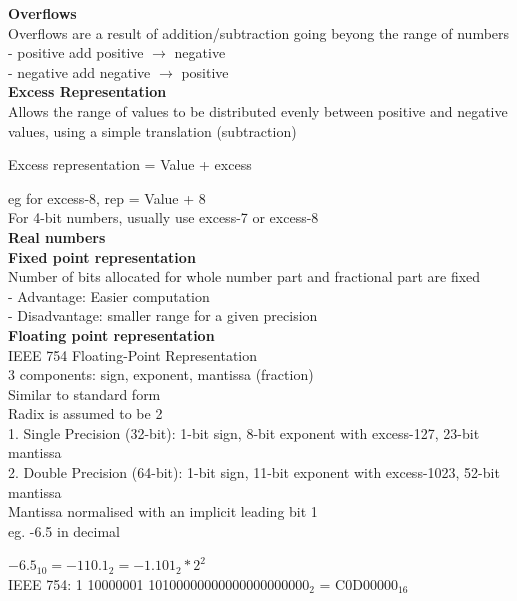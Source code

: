 \documentclass[10pt, a4paper]{article}
\begin{document}
\begin{multicols*}{3}
		\textbf{Overflows}\\
		Overflows are a result of addition/subtraction going beyong the range of numbers\\
		- positive add positive $\rightarrow$ negative\\
		- negative add negative $\rightarrow$ positive\\
		
		\textbf{Excess Representation}\\
		Allows the range of values to be distributed evenly between positive and negative values, using a simple translation (subtraction)
		\begin{center}
			Excess representation = Value + excess
		\end{center}
		eg for excess-8, rep = Value + 8\\
		For 4-bit  numbers, usually use excess-7 or excess-8\\
		
		\textbf{Real numbers}\\
		
		\textbf{Fixed point representation}\\
		Number of bits allocated for whole number part and fractional part are fixed\\
		- Advantage: Easier computation\\
		- Disadvantage: smaller range for a given precision\\		
		
		\textbf{Floating point representation}\\
		IEEE 754 Floating-Point Representation\\
		3 components: sign, exponent, mantissa (fraction)\\
		Similar to standard form\\
		Radix is assumed to be 2\\
		1. Single Precision (32-bit): 1-bit sign, 8-bit exponent with excess-127, 23-bit mantissa\\
		2. Double Precision (64-bit): 1-bit sign, 11-bit exponent with excess-1023, 52-bit mantissa\\
		Mantissa normalised with an implicit leading bit 1\\
		eg. -6.5 in decimal
		\begin{center}
			$-6.5_{10} = -110.1_2 = -1.101_2 * 2^2$\\
			IEEE 754: 1 10000001 10100000000000000000000$_2$ = C0D00000$_{16}$\\
		\end{center}
		

\end{multicols*}
\end{document}
